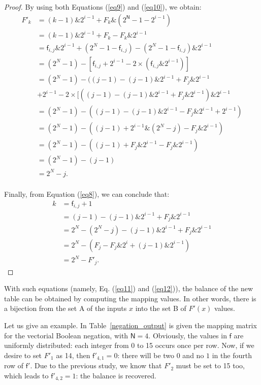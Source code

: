 \begin{proof}
By using both Equations (\ref{eq9}) and (\ref{eq10}), we obtain:
\begin{equation}
\label{eq11}
\begin{array}{ll}
F'_k&=(k-1)\&2^{i-1}+F_k\&(2^\mathsf{N}-1-2^{i-1})\\
&=(k-1)\&2^{i-1}+F_k-F_k\&2^{i-1}\\
&=\mathsf{f}_{i,j} \& 2^{i-1}+(2^N-1-\mathsf{f}_{i,j})-(2^N-1-\mathsf{f}_{i,j}) \& 2^{i-1}\\
&=(2^N-1)-[\mathsf{f}_{i,j}+2^{i-1}-2 \times (\mathsf{f}_{i,j} \& 2^{i-1})] \\
&=(2^N-1)-((j-1)-(j-1)\&2^{i-1}+F_j\&2^{i-1}\\
&+2^{i-1}-2 \times [((j-1)-(j-1) \& 2^{i-1}+F_j \& 2^{i-1})\& 2^{i-1}\\
&=(2^N-1)-((j-1)-(j-1)\&2^{i-1}-F_j\&2^{i-1}+2^{i-1})\\
&=(2^N-1)-((j-1)+2^{i-1}\&(2^N-j)-F_j\&2^{i-1})\\
&=(2^N-1)-((j-1)+F_j\&2^{i-1}-F_j\&2^{i-1})\\
&=(2^N-1)-(j-1)\\
&=2^N-j.\\
\end{array}
\end{equation}


Finally, from Equation (\ref{eq8}), we can conclude that:
\begin{equation}
\label{eq12}
\begin{array}{ll}
k&=\mathsf{f}_{i,j}+1\\
&=(j-1)-(j-1)\&2^{i-1}+F_j\&2^{i-1} \\
&=2^N-(2^N-j)-(j-1)\&2^{i-1}+F_j\&2^{i-1}\\
&=2^N-(F_j-F_j\&2^i+(j-1)\&2^{i-1})  \\
&=2^N-F'_j.
\end{array}
\end{equation}
\end{proof}

With such equations (namely, Eq. (\ref{eq11}) and (\ref{eq12})), the balance of the new table can be obtained by computing the mapping values. In other words, there is a bijection from the set A of the inputs $x$ into the set B of $F'(x)$ values.

Let us give an example. In Table~\ref{negation_output} is given the mapping matrix for the vectorial Boolean negation, with $\mathsf{N}=4$. Obviously, the values in $\mathsf{f}$ are uniformly distributed: each integer from 0 to 15 occurs once per row. 
Now, if we desire to set $F'_1$ as 14, then $\mathsf{f}'_{4,1}=0$: there will be two $0$ and no $1$ in the fourth row of $\mathsf{f}'$. Due to the previous study, we know that $F'_2$ must be set to 15 too, which leads to $\mathsf{f}'_{4,2}=1$: the balance is recovered.

